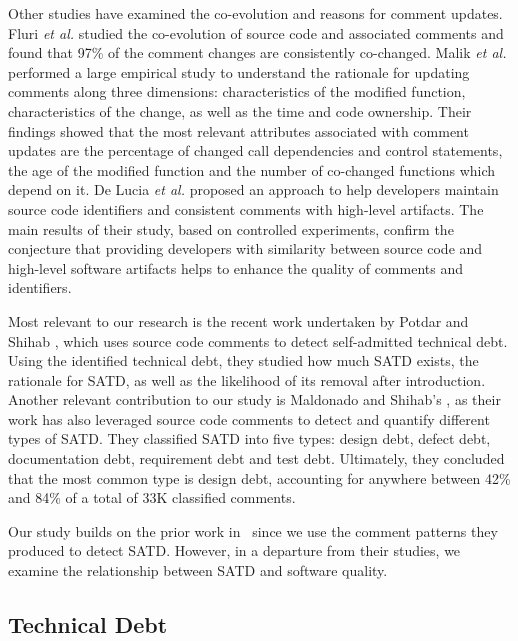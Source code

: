 Other studies have examined the co-evolution and reasons for comment updates. Fluri {\em et al.} \cite{fluri2007code} studied the co-evolution of source code and associated comments and found that 97\% of the comment changes are consistently co-changed. Malik {\em et al.}  \cite{malik2008understanding} performed a large empirical study to understand the rationale for updating comments along three dimensions: characteristics of the modified function, characteristics of the change, as well as the time and code ownership. Their findings showed that the most relevant attributes associated with comment updates are the percentage of changed call dependencies and control statements, the age of the modified function and the number of co-changed functions which depend on it. De Lucia {\em et al.} \cite{DeLucia2011} proposed an approach to help developers maintain source code identifiers and consistent comments with high-level artifacts. The main results of their study, based on controlled experiments, confirm the conjecture that providing  developers with similarity between source code and high-level software artifacts helps to enhance the quality of comments and identifiers.



Most relevant to our research is the recent work undertaken by Potdar and Shihab \cite{ICSM_PotdarS14}, which uses source code comments to detect self-admitted technical debt. Using the identified technical debt, they studied  how much SATD exists, the rationale for SATD, as well as the likelihood of its removal after introduction. Another relevant contribution to our study is Maldonado and Shihab's \cite{MTD15p9}, as their work has also leveraged source code comments to detect and quantify different types of SATD. They classified SATD into five types:  design debt, defect debt, documentation debt, requirement debt and test debt. Ultimately, they concluded that  the  most common type is design debt, accounting for anywhere between 42\% and 84\% of a total of 33K classified comments.

Our study builds on the prior work in~\cite{ICSM_PotdarS14,MTD15p9} since we use the comment patterns they produced to detect SATD. However, in a departure from their studies, we examine the relationship between SATD and software quality.


\subsection{Technical Debt}

